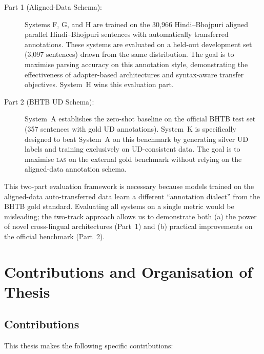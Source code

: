 \documentclass[12pt,a4paper,oneside]{report}
\newcommand{\las}{\textsc{las}}
\begin{document}
\begin{description}
  \item[Part 1 (Aligned-Data Schema):] Systems F, G, and H are trained
    on the 30,966 Hindi--Bhojpuri aligned parallel Hindi--Bhojpuri sentences with automatically
    transferred annotations. These systems are evaluated on a held-out development
    set (3,097 sentences) drawn from the same distribution. The goal is to maximise
    parsing accuracy on this annotation style, demonstrating the effectiveness of
    adapter-based architectures and syntax-aware transfer objectives. System~H wins
    this evaluation part.

  \item[Part 2 (BHTB UD Schema):] System~A establishes the zero-shot baseline
    on the official BHTB test set (357 sentences with gold UD annotations). System~K
    is specifically designed to beat System~A on this benchmark by generating silver
    UD labels and training exclusively on UD-consistent data. The goal is to maximise
    \las{} on the external gold benchmark without relying on the aligned-data annotation
    schema.
\end{description}

This two-part evaluation framework is necessary because models trained on the
aligned-data auto-transferred data learn a different ``annotation dialect'' from the
BHTB gold standard. Evaluating all systems on a single metric would be misleading;
the two-track approach allows us to demonstrate both (a) the power of novel
cross-lingual architectures (Part~1) and (b) practical improvements on the
official benchmark (Part~2).

\section{Contributions and Organisation of Thesis}

\subsection{Contributions}

This thesis makes the following specific contributions:
\end{document}
